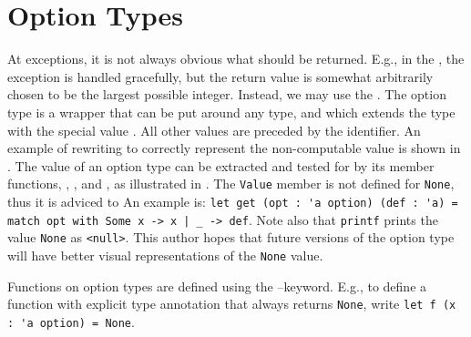 \documentclass[fsharpNotes.tex]{subfiles}
\begin{document}
\section{Option Types}
\label{sec:optionType}
At exceptions, it is not always obvious what should be returned. E.g., in the , the exception is handled gracefully, but the return value is somewhat arbitrarily chosen to be the largest possible integer. Instead, we may use the . The option type is a wrapper that can be put around any type, and which extends the type with the special value . All other values are preceded by the  identifier. An example of rewriting  to correctly represent the non-computable value is shown in .
%
%
The value of an option type can be extracted and tested for by its member functions, , , and , as illustrated in .
%
%
The \lstinline{Value} member is not defined for \lstinline{None}, thus it is adviced to  An example is: \lstinline{let get (opt : 'a option) (def : 'a) = match opt with Some x -> x | _ -> def}. Note also that \lstinline{printf} prints the value \lstinline{None} as \lstinline{<null>}. This author hopes that future versions of the option type will have better visual representations of the \lstinline{None} value.

Functions on option types are defined using the --keyword. E.g., to define a function with explicit type annotation that always returns \lstinline{None}, write \lstinline{let f (x : 'a option) = None}.
\end{document}
